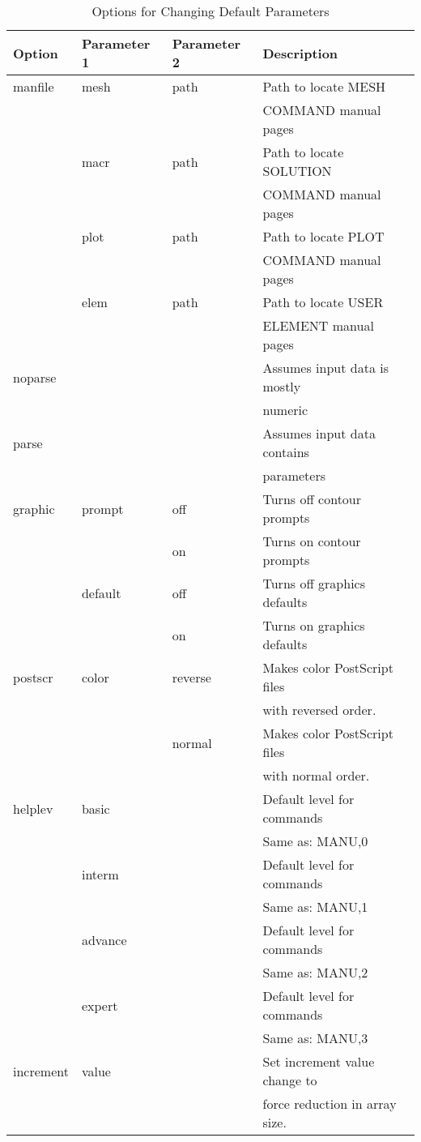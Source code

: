 \begin{table}
\begin{center}
\begin{tabular}{l l l |  l}
Option & Parameter 1 & Parameter 2 & Description \\ \hline
manfile & mesh & path & Path to locate MESH \\
 & & & COMMAND manual pages \\
        & macr & path & Path to locate SOLUTION \\
 & & & COMMAND manual pages \\
        & plot & path & Path to locate PLOT \\
 & & & COMMAND manual pages \\
        & elem & path & Path to locate USER \\
 & & & ELEMENT manual pages \\ \hline
noparse & & & Assumes input data is mostly \\
 & & & numeric  \\
parse & & & Assumes input data contains \\
 & & & parameters  \\ \hline
graphic & prompt & off & Turns off contour prompts \\
        &        & on  & Turns on contour prompts \\
        & default & off & Turns off graphics defaults \\
        &         & on  & Turns on graphics defaults \\ \hline
postscr & color & reverse & Makes color PostScript files \\
 & & & with reversed order. \\
        &       & normal  & Makes color PostScript files \\
 & & & with normal order. \\ \hline
helplev & basic & & Default level for commands \\
 & & & Same as: MANU,0 \\
        & interm & & Default level for commands \\
 & & & Same as: MANU,1 \\
        & advance & & Default level for commands \\
 & & & Same as: MANU,2 \\
        & expert & & Default level for commands \\
 & & & Same as: MANU,3 \\
increment & value & & Set increment value change to \\
 & & & force reduction in array size. \\
\end{tabular}
\caption{Options for Changing Default Parameters}
\label{tab22}
\end{center}
\end{table}
